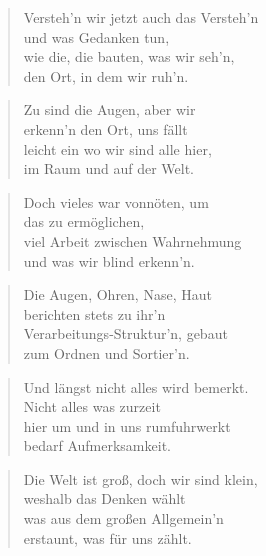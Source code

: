 \documentclass[10pt,a4paper]{article}
\begin{document}
\begin{paracol}{2}
\begin{verse}
Versteh’n wir jetzt auch das Versteh’n \\
und was Gedanken tun, \\
wie die, die bauten, was wir seh’n, \\
den Ort, in dem wir ruh’n. \\
\end{verse}

\begin{verse}
Zu sind die Augen, aber wir \\
erkenn’n den Ort, uns fällt \\
leicht ein wo wir sind alle hier, \\
im Raum und auf der Welt. \\
\end{verse}

\begin{verse}
Doch vieles war vonnöten, um \\
das zu ermöglichen, \\
viel Arbeit zwischen Wahrnehmung \\
und was wir blind erkenn’n. \\
\end{verse}

\begin{verse}
Die Augen, Ohren, Nase, Haut \\
berichten stets zu ihr’n \\
Verarbeitungs-Struktur’n, gebaut \\
zum Ordnen und Sortier’n. \\
\end{verse}

\begin{verse}
Und längst nicht alles wird bemerkt. \\
Nicht alles was zurzeit \\
hier um und in uns rumfuhrwerkt \\
bedarf Aufmerksamkeit. \\
\end{verse}

\begin{verse}
Die Welt ist groß, doch wir sind klein, \\
weshalb das Denken wählt \\
was aus dem großen Allgemein’n \\
erstaunt, was für uns zählt. \\
\end{verse}


\end{paracol}
\end{document}
